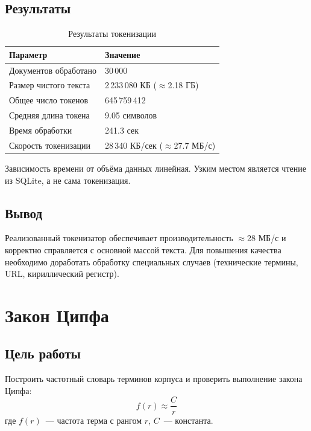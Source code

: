 \documentclass[12pt,a4paper]{article}
\begin{document}
\subsection{Результаты}

\begin{table}[h]
\centering
\begin{tabular}{@{}ll@{}}
\toprule
\textbf{Параметр} & \textbf{Значение} \\ \midrule
Документов обработано & 30\,000 \\
Размер чистого текста & 2\,233\,080 КБ ($\approx$2.18 ГБ) \\
Общее число токенов & 645\,759\,412 \\
Средняя длина токена & 9.05 символов \\
Время обработки & 241.3 сек \\
Скорость токенизации & 28\,340 КБ/сек ($\approx$27.7 МБ/с) \\ \bottomrule
\end{tabular}
\caption{Результаты токенизации}
\end{table}

Зависимость времени от объёма данных линейная. Узким местом является чтение из SQLite, а не сама токенизация.

\subsection{Вывод}

Реализованный токенизатор обеспечивает производительность $\approx$28 МБ/с и корректно справляется с основной массой текста. Для повышения качества необходимо доработать обработку специальных случаев (технические термины, URL, кириллический регистр).

\newpage


\section{Закон Ципфа}

\subsection{Цель работы}

Построить частотный словарь терминов корпуса и проверить выполнение закона Ципфа:
$$f(r) \approx \frac{C}{r}$$
где $f(r)$~--- частота терма с рангом $r$, $C$~--- константа.
\end{document}
